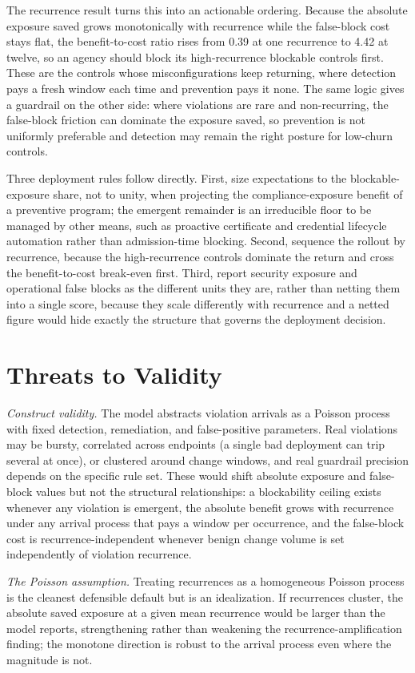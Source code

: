 \documentclass[journal]{IEEEtran}
\begin{document}
The recurrence result turns this into an actionable ordering. Because the absolute exposure saved
grows monotonically with recurrence while the false-block cost stays flat, the benefit-to-cost ratio
rises from 0.39 at one recurrence to 4.42 at twelve, so an agency should block its high-recurrence
blockable controls first. These are the controls whose misconfigurations keep returning, where
detection pays a fresh window each time and prevention pays it none. The same logic gives a guardrail
on the other side: where violations are rare and non-recurring, the false-block friction can dominate
the exposure saved, so prevention is not uniformly preferable and detection may remain the right
posture for low-churn controls.

Three deployment rules follow directly. First, size expectations to the blockable-exposure share,
not to unity, when projecting the compliance-exposure benefit of a preventive program; the emergent
remainder is an irreducible floor to be managed by other means, such as proactive certificate and
credential lifecycle automation rather than admission-time blocking. Second, sequence the rollout by
recurrence, because the high-recurrence controls dominate the return and cross the benefit-to-cost
break-even first. Third, report security exposure and operational false blocks as the different units
they are, rather than netting them into a single score, because they scale differently with
recurrence and a netted figure would hide exactly the structure that governs the deployment decision.

\section{Threats to Validity}
\emph{Construct validity.} The model abstracts violation arrivals as a Poisson process with fixed
detection, remediation, and false-positive parameters. Real violations may be bursty, correlated
across endpoints (a single bad deployment can trip several at once), or clustered around change
windows, and real guardrail precision depends on the specific rule set. These would shift absolute
exposure and false-block values but not the structural relationships: a blockability ceiling exists
whenever any violation is emergent, the absolute benefit grows with recurrence under any arrival
process that pays a window per occurrence, and the false-block cost is recurrence-independent
whenever benign change volume is set independently of violation recurrence.

\emph{The Poisson assumption.} Treating recurrences as a homogeneous Poisson process is the cleanest
defensible default but is an idealization. If recurrences cluster, the absolute saved exposure at a
given mean recurrence would be larger than the model reports, strengthening rather than weakening
the recurrence-amplification finding; the monotone direction is robust to the arrival process even
where the magnitude is not.
\end{document}
